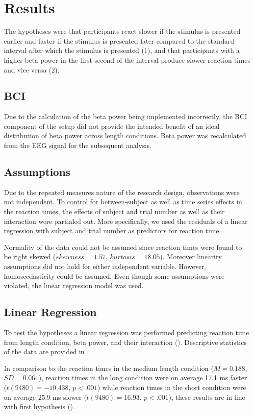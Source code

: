 \documentclass[man,floatsintext]{apa6} %
\begin{document}
\section{Results}
The hypotheses were that participants react slower if the stimulus is
presented earlier and faster if the stimulus is presented later
compared to the standard interval after which the stimulus is
presented (1), and that participants with a higher beta power in the
first second of the interval produce slower reaction times and vice
versa (2).

\subsection{BCI}
Due to the calculation of the beta power being implemented
incorrectly, the BCI component of the setup did not provide the
intended benefit of an ideal distribution of beta power across length
conditions. Beta power was recalculated from the EEG signal for the
subsequent analysis.

\subsection{Assumptions}
Due to the repeated measures nature of the research design,
observations were not independent. To control for between-subject as
well as time series effects in the reaction times, the effects of
subject and trial number as well as their interaction were partialed
out. More specifically, we used the residuals of a linear regression
with subject and trial number as predictors for reaction time.

Normality of the data could not be assumed since reaction times were
found to be right skewed ($skewness = 1.57$, $kurtosis =
18.05$). Moreover linearity assumptions did not hold for either
independent variable. However, homoscedasticity could be assumed. Even
though some assumptions were violated, the linear regression model was
used.

\subsection{Linear Regression}
To test the hypotheses a linear regression was performed predicting
reaction time from length condition, beta power, and their interaction
(). Descriptive statistics of the data are
provided in .

In comparison to the reaction times in the medium length condition ($M
= 0.188$, $SD = 0.061$), reaction times in the long condition were on
average 17.1 ms faster ($t(9480) = -10.438$, $p < .001$) while
reaction times in the short condition were on average 25.9 ms slower
($t(9480) = 16.93$, $p < .001$), these results are in line with first
hypothesis ().
\end{document}
